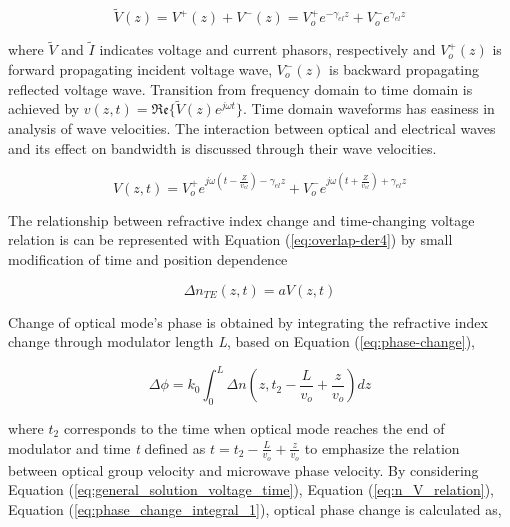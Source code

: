 \documentclass[thesis]{deutez}
\begin{document}
	\begin{equation}
		\tilde{V}(z) = V^{+}(z) + V^{-}(z) = V_o^{+} e^{-\gamma_{el} z} 		+ V_o^{-} e^{\gamma_{el} z}
		\label{eq:general_solution_voltage}
	\end{equation}
	
	
	where $\tilde{V}$ and $\tilde{I}$ indicates voltage and current phasors, respectively and $V_o^{+}(z)$ is forward propagating incident voltage wave, $V_o^{-}(z)$ is backward propagating reflected voltage wave.  Transition from frequency domain to time domain is achieved by $v(z,t) = \mathfrak{Re}\{\tilde{V}(z) e^{j\omega t} \}$. Time domain waveforms has easiness in analysis of wave velocities.  The interaction between optical and electrical waves and its effect on bandwidth is discussed through their wave velocities.     
	
	\begin{equation}
		V(z,t) = V_o^{+} e^{j\omega(t-\frac{Z}{v_{el}})-\gamma_{el} z} + V_o^{-} e^{j\omega(t+\frac{Z}{v_{el}})  +  \gamma_{el} z}
		\label{eq:general_solution_voltage_time}
	\end{equation}
	
	The relationship between refractive index change and time-changing voltage relation is can be represented with Equation (\ref{eq:overlap-der4}) by small modification of time and position dependence
	
	\begin{equation}
		\Delta n_{TE}(z,t) = aV(z,t)
		\label{eq:n_V_relation}
	\end{equation}

	Change of optical mode's phase is obtained by integrating the refractive index change through modulator length \textit{L}, based on Equation (\ref{eq:phase-change}),

    \begin{equation}
        \Delta \phi = k_0 \int_0^L \Delta n(z,t_2-\frac{L}{v_{o}}+\frac{z}{ v_{o}}) dz
        \label{eq:phase_change_integral_1}
    \end{equation}    
    
    where $t_2$ corresponds to the time when optical mode reaches the end of modulator and time \textit{t} defined as $ t =t_2-\frac{L}{v_{o}}+\frac{z}{ v_{o}}$ to emphasize the relation between optical group velocity and microwave phase velocity. By considering Equation (\ref{eq:general_solution_voltage_time}), Equation (\ref{eq:n_V_relation}), Equation (\ref{eq:phase_change_integral_1}), optical phase change is calculated as,
    
\end{document}
